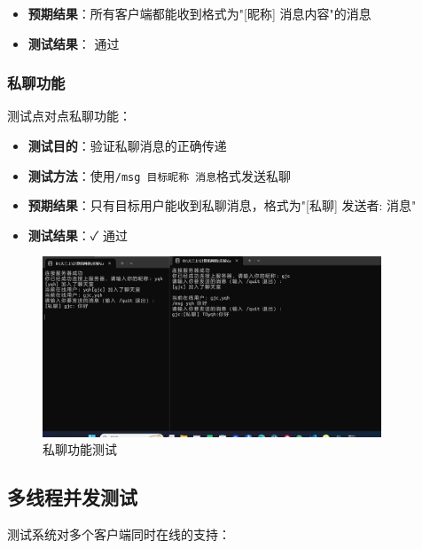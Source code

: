 \documentclass[12pt, a4paper]{article}
\newcommand{\cmd}[1]{\texttt{#1}}
\begin{document}
\begin{itemize}[itemsep=3pt]
  \item \textbf{预期结果}：所有客户端都能收到格式为"[昵称] 消息内容"的消息
  \item \textbf{测试结果}： 通过
\end{itemize}


\subsubsection{私聊功能}

测试点对点私聊功能：

\begin{itemize}[itemsep=3pt]
  \item \textbf{测试目的}：验证私聊消息的正确传递
  \item \textbf{测试方法}：使用\cmd{/msg 目标昵称 消息}格式发送私聊
  \item \textbf{预期结果}：只有目标用户能收到私聊消息，格式为"[私聊] 发送者: 消息"
  \item \textbf{测试结果}：✓ 通过
\end{itemize}

\begin{figure}[H]
   \centering
   \includegraphics[width=0.9\textwidth]{pic/private_chat_test.png}
   \caption{私聊功能测试}
   \label{fig:private_chat_test}
\end{figure}


\subsection{多线程并发测试}

测试系统对多个客户端同时在线的支持：
\end{document}
